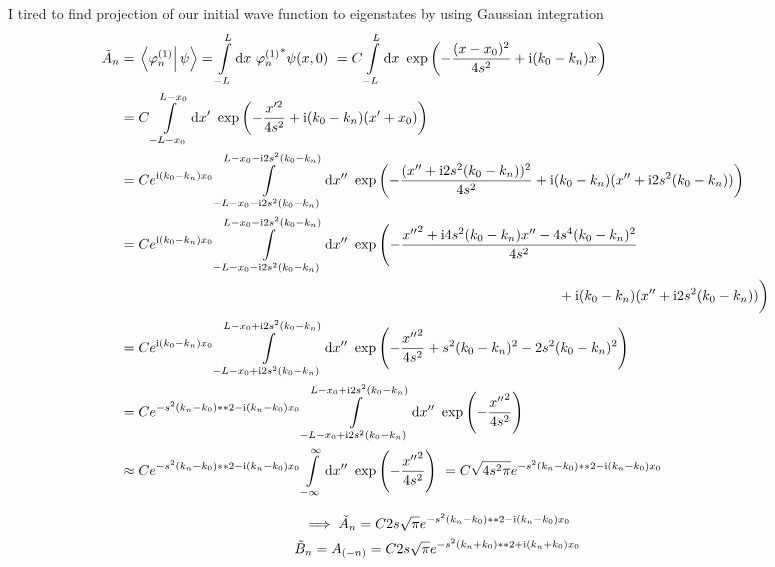 \documentclass[12pt]{article}
\begin{document}
I tired to find projection of our initial wave function to eigenstates by using Gaussian integration \begin{align*}
\tilde A_n & = \braket{\varphi_n^{(1)}}{\psi} = \integral[-L][L]{x}{{\varphi_n^{(1)}}^*\psi(x,0)} = C \integral[-L][L]{x}{\exp\left(-\frac{(x-x_0)^2}{4s^2} + \imagu (k_0-k_n) x\right)} \\
& = C\integral[-L-x_0][L-x_0]{x'}{\exp\left(-\frac{x'^2}{4s^2} + \imagu (k_0-k_n) (x'+x_0)\right)} \\
& = Ce^{\imagu (k_0-k_n)x_0} \integral[-L-x_0-\imagu 2s^2(k_0-k_n)][L-x_0-\imagu 2s^2(k_0-k_n)]{x''}{\exp\left(-\frac{(x''+\imagu 2s^2(k_0-k_n))^2}{4s^2} + \imagu (k_0-k_n) (x''+\imagu 2s^2(k_0-k_n))\right)} \\
& =Ce^{\imagu (k_0-k_n)x_0} \integral[-L-x_0-\imagu 2s^2(k_0-k_n)][L-x_0-\imagu 2s^2(k_0-k_n)]{x''}{\exp\left(-\frac{{x''}^2+\imagu 4s^2(k_0-k_n)x'' - 4s^4(k_0-k_n)^2}{4s^2}\right. \\ & \hspace*{11cm}+\imagu (k_0-k_n) (x''+\imagu 2s^2(k_0-k_n))\bigg)} \\
& =Ce^{\imagu (k_0-k_n)x_0} \integral[-L-x_0+\imagu 2s^2(k_0-k_n)][L-x_0+\imagu 2s^2(k_0-k_n)]{x''}{\exp\left(-\frac{{x''}^2}{4s^2}+ s^2(k_0-k_n)^2-2s^2(k_0-k_n)^2\right)}  \\
& = Ce^{- s^2 (k_n-k_0)**2 - \imagu (k_n-k_0)x_0} \integral[-L-x_0+\imagu 2s^2(k_0-k_n)][L-x_0+\imagu 2s^2(k_0-k_n)]{x''}{\exp\left(-\frac{{x''}^2}{4s^2}\right)} \\
& \approx C e^{- s^2 (k_n-k_0)**2 - \imagu (k_n-k_0)x_0} \integral[-\infty][\infty]{x''}{\exp\left(-\frac{{x''}^2}{4s^2}\right)} = C \sqrt{{4s^2\pi}}e^{- s^2 (k_n-k_0)**2 - \imagu (k_n-k_0)x_0}
\end{align*}

\begin{gather}
\implies \tilde A_n = C 2s\sqrt{\pi} e^{- s^2 (k_n-k_0)**2 - \mathrm i (k_n-k_0)x_0} \\ 
\tilde B_n = A_{(-n)} = C 2s\sqrt{\pi} e^{- s^2 (k_n+k_0)**2 + \mathrm i (k_n+k_0)x_0}
\end{gather}




\end{document}
